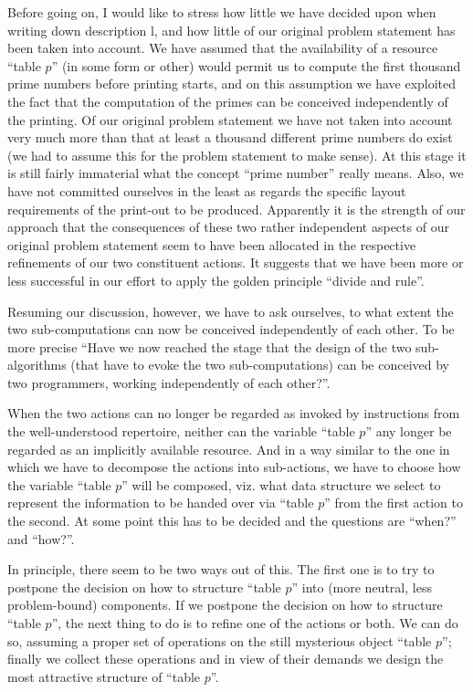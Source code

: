 Before going on, I would like to stress how little we have decided upon when writing down description l, and how little of our original problem statement has been taken into account. We have assumed that the availability of a resource ``table $p$'' (in some form or other) would permit us to compute the first thousand prime numbers before printing starts, and on this assumption we have exploited the fact that the computation of the primes can be conceived independently of the printing. Of our original problem statement we have not taken into account very much more than that at least a thousand different prime numbers do exist (we had to assume this for the problem statement to make sense). At this stage it is still fairly immaterial what the concept ``prime number'' really means. Also, we have not committed ourselves in the least as regards the specific layout requirements of the print-out to be produced. Apparently it is the strength of our approach that the consequences of these two rather independent aspects of our original problem statement seem to have been allocated in the respective refinements of our two constituent actions. It suggests that we have been more or less successful in our effort to apply the golden principle ``divide and rule''.

Resuming our discussion, however, we have to ask ourselves, to what extent the two sub-computations can now be conceived independently of each other. To be more precise ``Have we now reached the stage that the design of the two sub-algorithms (that have to evoke the two sub-computations) can be conceived by two programmers, working independently of each other?''.

When the two actions can no longer be regarded as invoked by instructions from the well-understood repertoire, neither can the variable ``table $p$'' any longer be regarded as an implicitly available resource. And in a way similar to the one in which we have to decompose the actions into sub-actions, we have to choose how the variable ``table $p$'' will be composed, viz. what data structure we select to represent the information to be handed over via ``table $p$'' from the first action to the second. At some point this has to be decided and the questions are ``when?'' and ``how?''.

In principle, there seem to be two ways out of this. The first one is to try to postpone the decision on how to structure ``table $p$'' into (more neutral, less problem-bound) components. If we postpone the decision on how to structure ``table $p$'', the next thing to do is to refine one of the actions or both. We can do so, assuming a proper set of operations on the still mysterious object ``table $p$''; finally we collect these operations and in view of their demands we design the most attractive structure of ``table $p$''.

